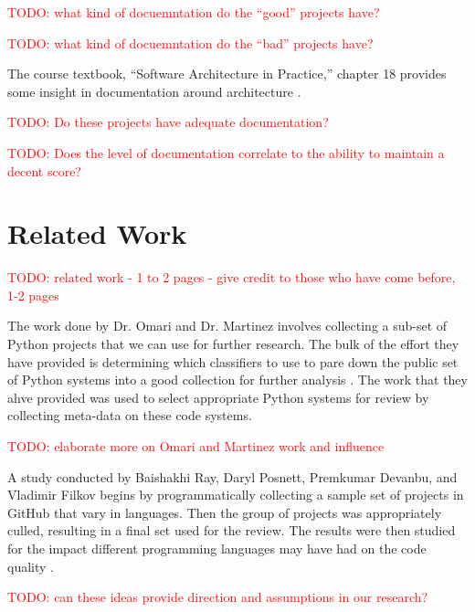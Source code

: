\documentclass[12pt,conference]{IEEEtran}
\newcommand\todo[1]{\textcolor{red}{#1}}
\begin{document}
\todo{TODO: what kind of docuemntation do the ``good'' projects have?}

\todo{TODO: what kind of docuemntation do the ``bad'' projects have?}


The course textbook, ``Software Architecture in Practice,'' chapter 18 provides some insight in documentation around architecture \cite{book:software-architecture-in-practice}. 

\todo{TODO: Do these projects have adequate documentation?}

\todo{TODO: Does the level of documentation correlate to the ability to maintain a decent score?}


\section{Related Work}
\todo{TODO: related work - 1 to 2 pages - give credit to those who have come before, 1-2 pages}

The work done by Dr. Omari and Dr. Martinez involves collecting a sub-set of Python projects that we can use for further research. The bulk of the effort they have provided is determining which classifiers to use to pare down the public set of Python systems into a good collection for further analysis \cite{omari:2018}. The work that they ahve provided was used to select appropriate Python systems for review by collecting meta-data on these code systems.

\todo{TODO: elaborate more on Omari and Martinez work and influence}

A study conducted by Baishakhi Ray, Daryl Posnett, Premkumar Devanbu, and Vladimir Filkov begins by programmatically collecting a sample set of projects in GitHub that vary in languages. Then the group of projects was appropriately culled, resulting in a final set used for the review. The results were then studied for the impact different programming languages may have had on the code quality \cite{baishakhi:2017}. 

\todo{TODO: can these ideas provide direction and assumptions in our research?}

\end{document}
